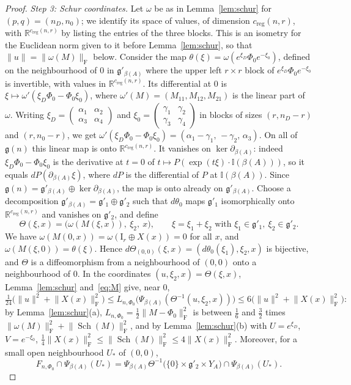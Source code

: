 \documentclass[11pt,a4paper]{article}
\theoremstyle{definition}
\theoremstyle{remark}
\numberwithin{equation}{section}
\newcommand{\R}{\mathbb{R}}
\newcommand{\Sch}{\operatorname{Sch}}
\newcommand{\id}{\mathrm{I}}
\newcommand{\Fr}[1]{\lVert #1\rVert_{\mathrm F}}
\newcommand{\norm}[1]{\lVert #1\rVert}
\newcommand{\creg}{c_{\mathrm{reg}}}
\newcommand{\I}{\mathbb I}
\newcommand{\g}{\mathfrak g}
\begin{document}
\begin{proof}
\emph{Step 3: Schur coordinates.} Let $\omega$ be as in Lemma~\ref{lem:schur} for $(p,q)=(n_D,n_0)$; we identify its space of values, of dimension $\creg(n,r)$, with $\R^{\creg(n,r)}$ by listing the entries of the three blocks. This is an isometry for the Euclidean norm given to it before Lemma~\ref{lem:schur}, so that $\norm u=\Fr{\omega(M)}$ below. Consider the map $\theta(\xi)=\omega(e^{\xi_D}\Phi_0e^{-\xi_0})$, defined on the neighbourhood of $0$ in $\g'_{\beta(A)}$ where the upper left $r\times r$ block of $e^{\xi_D}\Phi_0e^{-\xi_0}$ is invertible, with values in $\R^{\creg(n,r)}$. Its differential at $0$ is $\xi\mapsto\omega'(\xi_D\Phi_0-\Phi_0\xi_0)$, where $\omega'(M)=(M_{11},M_{12},M_{21})$ is the linear part of $\omega$. Writing $\xi_D=\begin{pmatrix}\alpha_1&\alpha_2\\\alpha_3&\alpha_4\end{pmatrix}$ and $\xi_0=\begin{pmatrix}\gamma_1&\gamma_2\\\gamma_3&\gamma_4\end{pmatrix}$ in blocks of sizes $(r,n_D-r)$ and $(r,n_0-r)$, we get $\omega'(\xi_D\Phi_0-\Phi_0\xi_0)=(\alpha_1-\gamma_1,\,-\gamma_2,\,\alpha_3)$. On all of $\g(n)$ this linear map is onto $\R^{\creg(n,r)}$. It vanishes on $\ker\partial_{\beta(A)}$: indeed $\xi_D\Phi_0-\Phi_0\xi_0$ is the derivative at $t=0$ of $t\mapsto P(\exp(t\xi)\cdot\I(\beta(A)))$, so it equals $dP(\partial_{\beta(A)}\xi)$, where $dP$ is the differential of $P$ at $\I(\beta(A))$. Since $\g(n)=\g'_{\beta(A)}\oplus\ker\partial_{\beta(A)}$, the map is onto already on $\g'_{\beta(A)}$. Choose a decomposition $\g'_{\beta(A)}=\g'_1\oplus\g'_2$ such that $d\theta_0$ maps $\g'_1$ isomorphically onto $\R^{\creg(n,r)}$ and vanishes on $\g'_2$, and define
\[
\Theta(\xi,x)=\bigl(\omega(M(\xi,x)),\ \xi_2,\ x\bigr),\qquad\xi=\xi_1+\xi_2\text{ with }\xi_1\in\g'_1,\ \xi_2\in\g'_2 .
\]
We have $\omega(M(0,x))=\omega(\id_r\oplus X(x))=0$ for all $x$, and $\omega(M(\xi,0))=\theta(\xi)$. Hence $d\Theta_{(0,0)}(\xi,x)=(d\theta_0(\xi_1),\xi_2,x)$ is bijective, and $\Theta$ is a diffeomorphism from a neighbourhood of $(0,0)$ onto a neighbourhood of $0$. In the coordinates $(u,\xi_2,x)=\Theta(\xi,x)$, Lemma~\ref{lem:schur} and~\eqref{eq:M} give, near $0$,
\begin{equation}\label{eq:reduced}
\tfrac1{24}\bigl(\norm u^2+\Fr{X(x)}^2\bigr)\le L_{n,\Phi_0}\bigl(\Psi_{\beta(A)}(\Theta^{-1}(u,\xi_2,x))\bigr)\le6\bigl(\norm u^2+\Fr{X(x)}^2\bigr):
\end{equation}
by Lemma~\ref{lem:schur}(a), $L_{n,\Phi_0}=\frac{1}{2}\Fr{M-\Phi_0}^2$ is between $\frac{1}{6}$ and $\frac{3}{2}$ times $\Fr{\omega(M)}^2+\Fr{\Sch(M)}^2$, and by Lemma~\ref{lem:schur}(b) with $U=e^{\xi_D}$, $V=e^{-\xi_0}$, $\frac{1}{4}\Fr{X(x)}^2\le\Fr{\Sch(M)}^2\le4\Fr{X(x)}^2$. Moreover, for a small open neighbourhood $U_*$ of $(0,0)$,
\[
F_{n,\Phi_0}\cap\Psi_{\beta(A)}(U_*)=\Psi_{\beta(A)}\Theta^{-1}\bigl(\{0\}\times\g'_2\times Y_A\bigr)\cap\Psi_{\beta(A)}(U_*).
\]


\end{proof}
\end{document}
